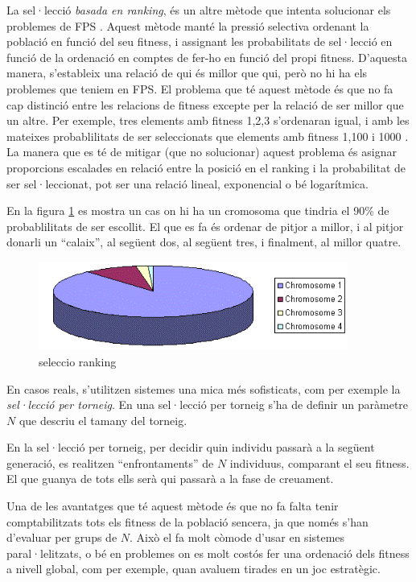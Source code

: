 La sel·lecció \emph{basada en ranking}, és un altre mètode que intenta
solucionar els problemes de FPS \cite{B87a}.  Aquest mètode manté la pressió
selectiva ordenant la població en funció del seu fitness, i assignant les
probabilitats de sel·lecció en funció de la ordenació en comptes de fer-ho en
funció del propi fitness. D'aquesta manera, s'estableix una relació de qui és
millor que qui, però no hi ha els problemes que teniem en FPS.  El problema que
té aquest mètode és que no fa cap distinció entre les relacions de fitness
excepte per la relació de ser millor que un altre.  Per exemple, tres elements
amb fitness 1,2,3 s'ordenaran igual, i amb les mateixes probablilitats de ser
seleccionats que elements amb fitness 1,100 i 1000 .  La manera que es té de
mitigar (que no solucionar) aquest problema és asignar proporcions escalades en
relació entre la posició en el ranking i la probabilitat de ser sel·leccionat,
pot ser una relació lineal, exponencial o bé logarítmica. 

En la figura \ref{fig:rank1} es mostra  un cas on hi ha un cromosoma que tindria
el 90\% de probablilitats de ser escollit. El que es fa és ordenar de pitjor a
millor, i al pitjor donarli un ``calaix'', al següent dos, al següent tres, i
finalment, al millor quatre. 

\begin{figure} \centering \includegraphics[width=4in]{intro/rank1.png}
\caption{\label{fig:rank1}seleccio ranking}
\end{figure}

En casos reals, s'utilitzen sistemes una mica més sofisticats, com per exemple
la \emph{sel·lecció per torneig}.  En una sel·lecció per torneig s'ha de definir
un paràmetre $N$ que descriu el tamany del torneig.

En la sel·lecció per torneig, per decidir quin individu passarà a la següent
generació, es realitzen ``enfrontaments'' de $N$ individuus, comparant el seu
fitness.  El que guanya de tots ells serà qui passarà a la fase de creuament.

Una de les avantatges que té aquest mètode és que no fa falta tenir
comptabilitzats tots els fitness de la població sencera, ja que només s'han
d'evaluar per grups de $N$.  Això el fa molt còmode d'usar en sistemes
paral·lelitzats, o bé en problemes on es molt costós fer una ordenació dels
fitness a nivell global, com per exemple, quan avaluem tirades en un joc
estratègic.

